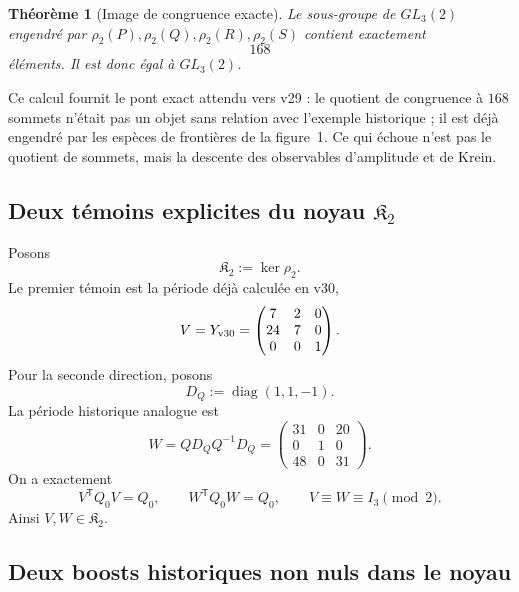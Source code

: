 \documentclass[11pt,a4paper]{article}
\newtheorem{theorem}{Théorème}[section]
\begin{document}
\begin{theorem}[Image de congruence exacte]\label{thm:v31-mod2-surjective}
Le sous-groupe de $GL_3(2)$ engendré par
$\rho_2(P),\rho_2(Q),\rho_2(R),\rho_2(S)$ contient exactement
\[
 \boxed{168}
\]
éléments. Il est donc égal à $GL_3(2)$.
\end{theorem}

Ce calcul fournit le pont exact attendu vers v29 : le quotient de congruence à $168$ sommets
n'était pas un objet sans relation avec l'exemple historique ; il est déjà engendré par les espèces
de frontières de la figure~1. Ce qui échoue n'est pas le quotient de sommets, mais la descente des
observables d'amplitude et de Krein.

\subsection{Deux témoins explicites du noyau \texorpdfstring{$\mathfrak K_2$}{K2}}

Posons
\begin{equation}\label{eq:v31-K2}
 \mathfrak K_2:=\ker\rho_2.
\end{equation}
Le premier témoin est la période déjà calculée en v30,
\[
 V=Y_{\rm v30}
 =
 \begin{pmatrix}
 7&2&0\\24&7&0\\0&0&1
 \end{pmatrix}.
\]
Pour la seconde direction, posons
\[
 D_Q:=\operatorname{diag}(1,1,-1).
\]
La période historique analogue est
\begin{equation}\label{eq:v31-W-factor}
 \boxed{
 W=QD_QQ^{-1}D_Q
 =
 \begin{pmatrix}
 31&0&20\\
 0&1&0\\
 48&0&31
 \end{pmatrix}.}
\end{equation}
On a exactement
\begin{equation}\label{eq:v31-kernel-witnesses}
 \boxed{
 V^{\mathsf T}Q_0V=Q_0,
 \qquad
 W^{\mathsf T}Q_0W=Q_0,
 \qquad
 V\equiv W\equiv I_3\pmod2.}
\end{equation}
Ainsi $V,W\in\mathfrak K_2$.

\subsection{Deux boosts historiques non nuls dans le noyau}
\end{document}
